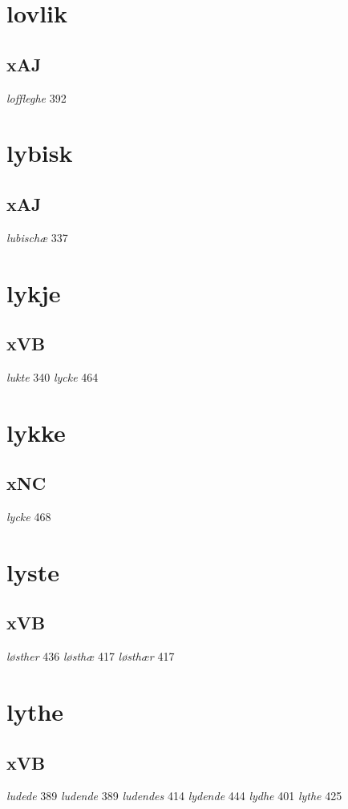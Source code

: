 \documentclass[a4paper,twocolumn]{article}
\begin{document}
\section{lovlik}
\label{sec:orgcf886bc}
\subsection{xAJ}
\label{sec:org82c92a8}
\emph{loffleghe} 392 
\section{lybisk}
\label{sec:org4c86280}
\subsection{xAJ}
\label{sec:org903843b}
\emph{lubischæ} 337 
\section{lykje}
\label{sec:org459c346}
\subsection{xVB}
\label{sec:org42614de}
\emph{lukte} 340 \emph{lycke} 464 
\section{lykke}
\label{sec:orge09051c}
\subsection{xNC}
\label{sec:orgfb6c8d3}
\emph{lycke} 468 
\section{lyste}
\label{sec:orgfe015b5}
\subsection{xVB}
\label{sec:org17447aa}
\emph{løsther} 436 \emph{løsthæ} 417 \emph{løsthær} 417 
\section{lythe}
\label{sec:org0798869}
\subsection{xVB}
\label{sec:org3ac8561}
\emph{ludede} 389 \emph{ludende} 389 \emph{ludendes} 414 \emph{lydende} 444 \emph{lydhe} 401 \emph{lythe} 425 
\end{document}
